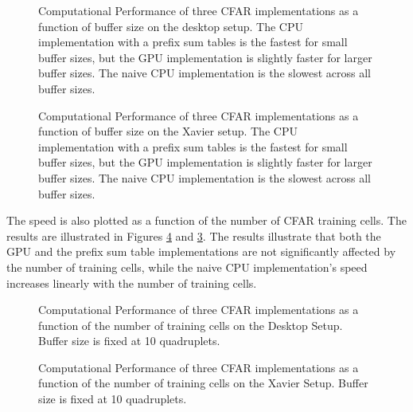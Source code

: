 \begin{figure}[htbp]
    \centering
     
    \caption{Computational Performance of three CFAR implementations as a function of buffer size on the desktop setup. The CPU implementation with a prefix sum tables is the fastest for small buffer sizes, but the GPU implementation is slightly faster for larger buffer sizes. The naive CPU implementation is the slowest across all buffer sizes.}
    \label{fig:cfar-implementation-performance-desktop}
\end{figure}

\begin{figure}[htbp]
    \centering
     
    \caption{Computational Performance of three CFAR implementations as a function of buffer size on the Xavier setup. The CPU implementation with a prefix sum tables is the fastest for small buffer sizes, but the GPU implementation is slightly faster for larger buffer sizes. The naive CPU implementation is the slowest across all buffer sizes.}
    \label{fig:cfar-implementation-performance-Xavier}
\end{figure}

The speed is also plotted as a function of the number of CFAR training cells. The results are illustrated in Figures \ref{fig:cfar-implementation-performance-Xavier-training-cells} and \ref{fig:cfar-implementation-performance-desktop-training-cells}. The results illustrate that both the GPU and the prefix sum table implementations are not significantly affected by the number of training cells, while the naive CPU implementation's speed increases linearly with the number of training cells.

\begin{figure}
    \centering
     
    \caption{Computational Performance of three CFAR implementations as a function of the number of training cells on the Desktop Setup. Buffer size is fixed at 10 quadruplets.}
    \label{fig:cfar-implementation-performance-desktop-training-cells}
\end{figure}


\begin{figure}
    \centering
    \caption{Computational Performance of three CFAR implementations as a function of the number of training cells on the Xavier Setup. Buffer size is fixed at 10 quadruplets.}
    \label{fig:cfar-implementation-performance-Xavier-training-cells}
\end{figure}



